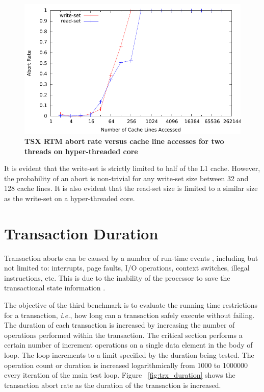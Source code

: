 \documentclass[11pt]{book}
\begin{document}
\begin{figure}[H]
    \centering
    \graphicspath{ {./figures/} }
    \includegraphics[width=\textwidth,height=\textheight,keepaspectratio]{trxSize_hyperthreaded}
    \caption{\textbf{TSX RTM abort rate versus cache line accesses for two 
    threads on hyper-threaded core}}
    \label{fig:trx_size_ht}
\end{figure}

It is evident that the write-set is strictly limited to half of the L1 cache.  However,
the probability of an abort is non-trivial for any write-set size between 32 and 128 cache
lines.  It is also evident that the read-set size is limited to a similar size as the
write-set on a hyper-threaded core.

\section{Transaction Duration}

Transaction aborts can be caused by a number of run-time events \cite{intel_prog_ref},
including but not limited to: interrupts, page faults, I/O operations, context switches,
illegal instructions, etc.  This is due to the inability of the processor to save the
transactional state information \cite{schwahn}.

The objective of the third benchmark is to evaluate the running time
restrictions for a transaction, \emph{i.e.}, how long can a transaction safely
execute without failing.  The duration of each transaction is increased by
increasing the number of operations performed within the transaction. The
critical section performs a certain number of increment operations on a single
data element in the body of loop.  The loop increments to a limit specified by
the duration being tested.  The operation count or duration is increased
logarithmically from 1000 to 1000000 every iteration of the main test loop.
Figure ~\ref{fig:trx_duration} shows the transaction abort rate as the duration
of the transaction is increased.
\end{document}
